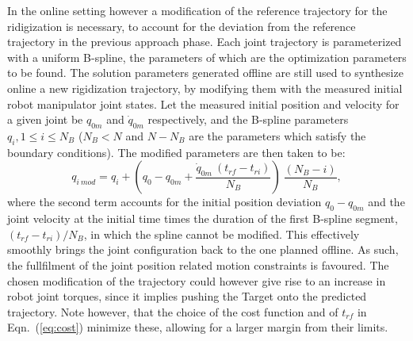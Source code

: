 In the online setting however a modification of the reference trajectory for the ridigization is necessary, to account for the deviation from the reference trajectory in the previous approach phase. Each joint trajectory is parameterized with a uniform B-spline, the parameters of which are the optimization parameters to be found. The solution parameters generated offline are still used to synthesize online a new rigidization trajectory, by modifying them with the measured initial robot manipulator joint states. Let the measured initial position and velocity for a given joint be $q_{0m}$ and $\dot{q}_{0m}$ respectively, and the B-spline parameters $q_i, 1 \leq i \leq N_B$ ($N_B<N$ and $N-N_B$ are the parameters which satisfy the boundary conditions). The modified parameters are then taken to be:
\begin{equation}
q_{i \: mod} =   q_i +  \left( q_0 - q_{0m} + \frac{\dot{q}_{0m} \: ({t_{rf}}-{t_{ri}})}{N_B} \right) \: \frac{(N_B-i)}{N_B},
\end{equation}
where the second term accounts for the initial position deviation $q_0 - q_{0m}$ and the joint velocity at the initial time times the duration of the first B-spline segment, $({t_{rf}}-{t_{ri}})/N_B$, in which the spline cannot be modified. This effectively smoothly brings the joint configuration back to the one planned offline. As such, the fullfilment of the joint position related motion constraints is favoured. The chosen modification of the trajectory could however give rise to an increase in robot joint torques, since it implies pushing the Target onto the predicted trajectory. Note however, that the choice of the cost function and of $t_{rf}$ in Eqn.~(\ref{eq:cost}) minimize these, allowing for a larger margin from their limits.
%

